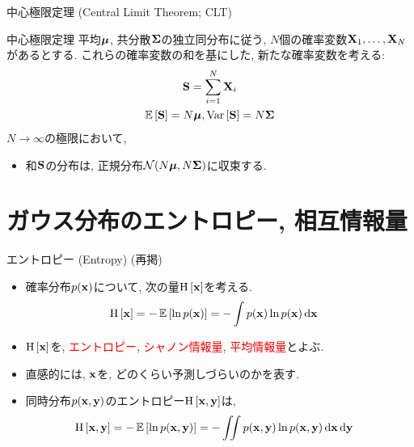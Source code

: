 \documentclass[dvipdfmx,notheorems,t]{beamer}
\begin{document}
\begin{frame}{中心極限定理 (Central Limit Theorem; CLT)}
\begin{block}{中心極限定理}
  平均$\vb*{\mu}$, 共分散$\vb{\Sigma}$の独立同分布に従う, $N$個の確率変数$\vb{X}_1, \ldots, \vb{X}_N$があるとする.
  これらの確率変数の和を基にした, 新たな確率変数を考える:
  \begin{gather*}
    \vb{S} = \sum_{i = 1}^N \vb{X}_i \\
    \operatorname{\mathbb{E}} \left[ \vb{S} \right] = N \vb*{\mu}, \operatorname{Var} \left[ \vb{S} \right] = N \vb{\Sigma}
  \end{gather*}
  $N \to \infty$の極限において,
  \begin{itemize}
    \item 和$\vb{S}$の分布は, 正規分布$\mathcal{N}(N \vb*{\mu}, N \vb{\Sigma})$に収束する.
  \end{itemize}
\end{block}
\end{frame}

\section{ガウス分布のエントロピー, 相互情報量}

\begin{frame}{エントロピー (Entropy) (再掲)}
\begin{itemize}
  \item 確率分布$p(\vb{x})$について, 次の量$\operatorname{H} \left[ \vb{x} \right]$を考える.
  \begin{align*}
    \operatorname{H} \left[ \vb{x} \right] &= -\operatorname{\mathbb{E}} \left[ \ln p(\vb{x}) \right] = - \int p(\vb{x}) \ln p(\vb{x}) \dd{\vb{x}}
  \end{align*}
  \item $\operatorname{H} \left[ \vb{x} \right]$を, \textcolor{red}{エントロピー}, \textcolor{red}{シャノン情報量}, \textcolor{red}{平均情報量}とよぶ.
  \item 直感的には, $\vb{x}$を, どのくらい予測しづらいのかを表す.
  \item 同時分布$p(\vb{x}, \vb{y})$のエントロピー$\operatorname{H} \left[ \vb{x}, \vb{y} \right]$は,
  \begin{align*}
    \operatorname{H} \left[ \vb{x}, \vb{y} \right] &= -\operatorname{\mathbb{E}} \left[ \ln p(\vb{x}, \vb{y}) \right]
      = - \iint p(\vb{x}, \vb{y}) \ln p(\vb{x}, \vb{y}) \dd{\vb{x}} \dd{\vb{y}}
  \end{align*}
\end{itemize}
\end{frame}
\end{document}
